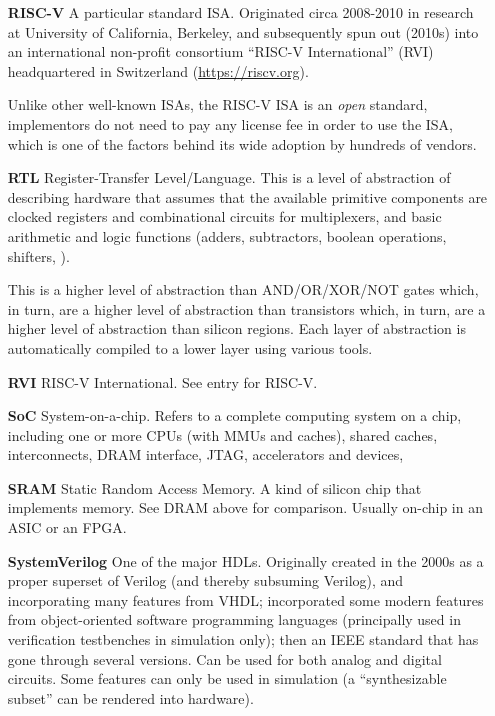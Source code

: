 \begin{itemize}
\item[\bf RISC-V] A particular standard ISA.  Originated circa
  2008-2010 in research at University of California, Berkeley, and
  subsequently spun out (2010s) into an international non-profit
  consortium ``RISC-V International'' (RVI) headquartered in
  Switzerland (\url{https://riscv.org}).

  Unlike other well-known ISAs, the RISC-V ISA is an \emph{open}
  standard, {\ie} implementors do not need to pay any license fee in
  order to use the ISA, which is one of the factors behind its wide
  adoption by hundreds of vendors.

\item[\bf RTL] Register-Transfer Level/Language.  This is a level of
  abstraction of describing hardware that assumes that the available
  primitive components are clocked registers and combinational
  circuits for multiplexers, and basic arithmetic and logic functions
  (adders, subtractors, boolean operations, shifters, {\etc}).

  This is a higher level of abstraction than AND/OR/XOR/NOT gates
  which, in turn, are a higher level of abstraction than transistors
  which, in turn, are a higher level of abstraction than silicon
  regions.  Each layer of abstraction is automatically compiled to a
  lower layer using various tools.

\item[\bf RVI] RISC-V International.  See entry for RISC-V.

\item[\bf SoC] System-on-a-chip.  Refers to a complete computing
  system on a chip, including one or more CPUs (with MMUs and caches),
  shared caches, interconnects, DRAM interface, JTAG, accelerators and
  devices, {\etc}

\item[\bf SRAM] Static Random Access Memory.  A kind of silicon chip
  that implements memory.  See DRAM above for comparison.  Usually
  on-chip in an ASIC or an FPGA.

\item[\bf SystemVerilog] One of the major HDLs.  Originally created in
  the 2000s as a proper superset of Verilog (and thereby subsuming
  Verilog), and incorporating many features from VHDL; incorporated
  some modern features from object-oriented software programming
  languages (principally used in verification testbenches in
  simulation only); then an IEEE standard that has gone through
  several versions.  Can be used for both analog and digital circuits.
  Some features can only be used in simulation (a ``synthesizable
  subset'' can be rendered into hardware).


\end{itemize}
